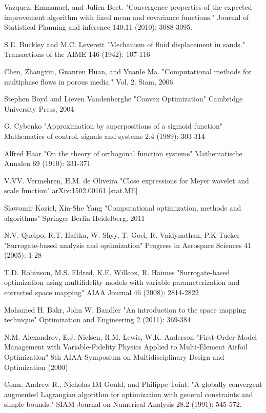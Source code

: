 \documentclass[a4paper,onecolumn]{article}
\theoremstyle{remark}
\begin{document}
\begin{thebibliography}{9}
Vazquez, Emmanuel, and Julien Bect. 
"Convergence properties of the expected improvement algorithm with fixed mean and covariance functions." 
Journal of Statistical Planning and inference 140.11 (2010): 3088-3095.

S.E. Buckley and M.C. Leverett
"Mechanism of fluid displacement in sands."
Transactions of the AIME 146 (1942): 107-116

Chen, Zhangxin, Guanren Huan, and Yuanle Ma. 
"Computational methods for multiphase flows in porous media."
Vol. 2. Siam, 2006.

Stephen Boyd and Lieven Vandenberghe
"Convex Optimization"
Cambridge University Press, 2004

G. Cybenko
"Approximation by superpositions of a sigmoid function"
Mathematics of control, signals and systems 2.4 (1989): 303-314

Alfred Haar
"On the theory of orthogonal function systems"
Mathematische Annalen 69 (1910): 331-371

V.VV. Vermehren, H.M. de Oliveira
"Close expressions for Meyer wavelet and scale function"
arXiv:1502.00161 [stat.ME]

Slawomir Koziel, Xin-She Yang
"Computational optimization, methods and algorithms"
Springer Berlin Heidelberg, 2011

N.V. Queipo, R.T. Haftka, W. Shyy, T. Goel, R. Vaidynathan, P.K Tucker
"Surrogate-based analysis and optimization"
Progress in Aerospace Sciences 41 (2005): 1-28

T.D. Robinson, M.S. Eldred, K.E. Willcox, R. Haimes
"Surrogate-based optimization using multifidelity models with variable 
parameterization and corrected space mapping"
AIAA Journal 46 (2008): 2814-2822

Mohamed H. Bakr, John W. Bandler
"An introduction to the space mapping technique"
Optimization and Engineering 2 (2011): 369-384

N.M. Alexandrov, E.J. Nielsen, R.M. Lewis, W.K. Anderson
"First-Order Model Management with Variable-Fidelity Physics 
Applied to Multi-Element Airfoil Optimization"
8th AIAA Symposium on Multidisciplinary Design and Optimization (2000)

Conn, Andrew R., Nicholas IM Gould, and Philippe Toint. 
"A globally convergent augmented Lagrangian algorithm for optimization with general constraints and simple bounds."
SIAM Journal on Numerical Analysis 28.2 (1991): 545-572.


\end{thebibliography}
\end{document}
